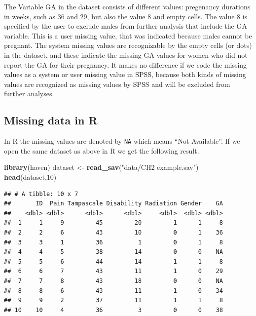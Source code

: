 \documentclass[]{book}
\newenvironment{Shaded}{\begin{snugshade}}{\end{snugshade}}
\newcommand{\KeywordTok}[1]{\textcolor[rgb]{0.13,0.29,0.53}{\textbf{#1}}}
\newcommand{\DecValTok}[1]{\textcolor[rgb]{0.00,0.00,0.81}{#1}}
\newcommand{\StringTok}[1]{\textcolor[rgb]{0.31,0.60,0.02}{#1}}
\newcommand{\NormalTok}[1]{#1}
\begin{document}
The Variable GA in the dataset consists of different values: pregenancy
durations in weeks, such as 36 and 29, but also the value 8 and empty
cells. The value 8 is specified by the user to exclude males from
further analysis that include the GA variable. This is a user missing
value, that was indicated because males cannot be pregnant. The system
missing values are recognizable by the empty cells (or dots) in the
dataset, and these indicate the missing GA values for women who did not
report the GA for their pregnancy. It makes no difference if we code the
missing values as a system or user missing value in SPSS, because both
kinds of missing values are recognized as missing values by SPSS and
will be excluded from further analyses.

\subsection{Missing data in R}\label{missing-data-in-r}

In R the missing values are denoted by \texttt{NA} which means ``Not
Available''. If we open the same dataset as above in R we get the
following result.

\begin{Shaded}
\begin{Highlighting}[]
\KeywordTok{library}\NormalTok{(haven)}
\NormalTok{dataset <-}\StringTok{ }\KeywordTok{read_sav}\NormalTok{(}\StringTok{"data/CH2 example.sav"}\NormalTok{)}
\KeywordTok{head}\NormalTok{(dataset,}\DecValTok{10}\NormalTok{)}
\end{Highlighting}
\end{Shaded}

\begin{verbatim}
## # A tibble: 10 x 7
##       ID  Pain Tampascale Disability Radiation Gender    GA
##    <dbl> <dbl>      <dbl>      <dbl>     <dbl>  <dbl> <dbl>
##  1     1     9         45         20         1      1     8
##  2     2     6         43         10         0      1    36
##  3     3     1         36          1         0      1     8
##  4     4     5         38         14         0      0    NA
##  5     5     6         44         14         1      1     8
##  6     6     7         43         11         1      0    29
##  7     7     8         43         18         0      0    NA
##  8     8     6         43         11         1      0    34
##  9     9     2         37         11         1      1     8
## 10    10     4         36          3         0      0    38
\end{verbatim}
\end{document}
